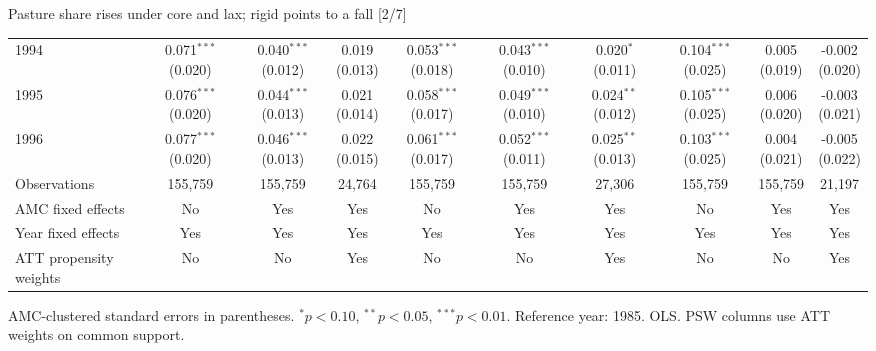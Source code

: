 \documentclass[aspectratio=169]{beamer}
\begin{document}
\begin{frame}{Pasture share rises under core and lax; rigid points to a fall [2/7]}
{\begin{tabular}{@{}l*{9}{c}@{}}
1994 & \shortstack{0.071$^{***}$\\(0.020)} & \shortstack{0.040$^{***}$\\(0.012)} & \shortstack{0.019\\(0.013)} & \shortstack{0.053$^{***}$\\(0.018)} & \shortstack{0.043$^{***}$\\(0.010)} & \shortstack{0.020$^{*}$\\(0.011)} & \shortstack{0.104$^{***}$\\(0.025)} & \shortstack{0.005\\(0.019)} & \shortstack{-0.002\\(0.020)} \\
1995 & \shortstack{0.076$^{***}$\\(0.020)} & \shortstack{0.044$^{***}$\\(0.013)} & \shortstack{0.021\\(0.014)} & \shortstack{0.058$^{***}$\\(0.017)} & \shortstack{0.049$^{***}$\\(0.010)} & \shortstack{0.024$^{**}$\\(0.012)} & \shortstack{0.105$^{***}$\\(0.025)} & \shortstack{0.006\\(0.020)} & \shortstack{-0.003\\(0.021)} \\
1996 & \shortstack{0.077$^{***}$\\(0.020)} & \shortstack{0.046$^{***}$\\(0.013)} & \shortstack{0.022\\(0.015)} & \shortstack{0.061$^{***}$\\(0.017)} & \shortstack{0.052$^{***}$\\(0.011)} & \shortstack{0.025$^{**}$\\(0.013)} & \shortstack{0.103$^{***}$\\(0.025)} & \shortstack{0.004\\(0.021)} & \shortstack{-0.005\\(0.022)} \\
\midrule
Observations & 155,759 & 155,759 & 24,764 & 155,759 & 155,759 & 27,306 & 155,759 & 155,759 & 21,197 \\
AMC fixed effects & No & Yes & Yes & No & Yes & Yes & No & Yes & Yes \\
Year fixed effects & Yes & Yes & Yes & Yes & Yes & Yes & Yes & Yes & Yes \\
ATT propensity weights & No & No & Yes & No & No & Yes & No & No & Yes \\
\bottomrule
\end{tabular}%
}
\vspace{0.1em}
{\tiny\color{ZMidGray} AMC-clustered standard errors in parentheses. $^{*}p<0.10$, $^{**}p<0.05$, $^{***}p<0.01$. Reference year: 1985. OLS. PSW columns use ATT weights on common support.}
\end{frame}
\end{document}
